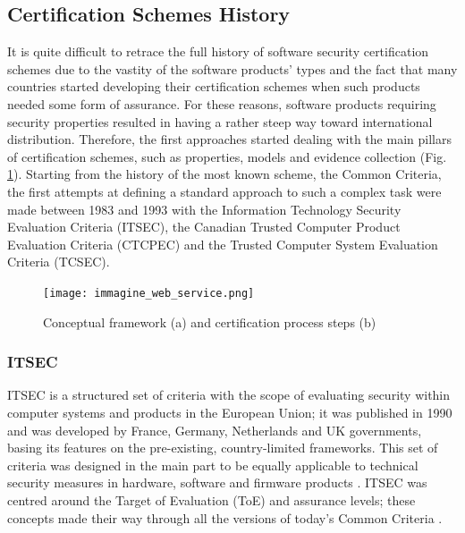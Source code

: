 \subsection{Certification Schemes History}
It is quite difficult to retrace the full history of software security certification schemes due to the vastity of the software products' types and the fact that many countries started developing their certification schemes when such products needed some form of assurance. For these reasons, software products requiring security properties resulted in having a rather steep way toward international distribution. Therefore, the first approaches started dealing with the main pillars of certification schemes, such as properties, models and evidence collection (Fig. \ref{Fig:OldProcess}). Starting from the history of the most known scheme, the Common Criteria, the first attempts at defining a standard approach to such a complex task were made between 1983 and 1993 with the Information Technology Security Evaluation Criteria (ITSEC), the Canadian Trusted Computer Product Evaluation Criteria (CTCPEC) and the Trusted Computer System Evaluation Criteria (TCSEC).
\begin{figure}[htb]
\texttt{[image: immagine\_web\_service.png]}
\caption{Conceptual framework (a) and certification process steps (b) \cite{anisetti2013test}}
\label{Fig:OldProcess}
\end{figure}
\subsubsection{ITSEC}
ITSEC is a structured set of criteria with the scope of evaluating security within computer systems and products in the European Union; it was published in 1990 and was developed by France, Germany, Netherlands and UK governments, basing its features on the pre-existing, country-limited frameworks. This set of criteria was designed in the main part to be equally applicable to technical security measures in hardware, software and firmware products \cite{ITSEC}. ITSEC was centred around the Target of Evaluation (ToE) and assurance levels; these concepts made their way through all the versions of today's Common Criteria \cite{infrastructure2002common}.

